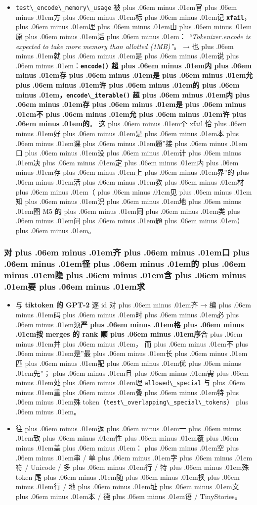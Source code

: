 \documentclass[
]{article}
\newcommand{\passthrough}[1]{#1}
\providecommand{\tightlist}{%
  \setlength{\itemsep}{0pt}\setlength{\parskip}{0pt}}
\def\zh#1{{\zhfont #1}}
\def\sym#1{{\symfont #1}}
\def\zhglue{\hskip0pt plus .06em minus .01em}
\begin{document}
\begin{itemize}
\tightlist
\item
  \passthrough{\lstinline!test\_encode\_memory\_usage!} \zh{被\zhglue 官\zhglue 方\zhglue 标\zhglue 记} \textbf{\passthrough{\lstinline!xfail!}}\zh{，\zhglue 理\zhglue 由\zhglue 原\zhglue 话\zhglue ：} \emph{``Tokenizer.encode is expected to take more memory than allotted (1MB)''}\zh{。} \sym{→} \zh{也\zhglue 就\zhglue 是\zhglue 说\zhglue ：}\textbf{\passthrough{\lstinline!encode()!} \zh{超\zhglue 内\zhglue 存\zhglue 是\zhglue 允\zhglue 许\zhglue 的\zhglue ，}\passthrough{\lstinline!encode\_iterable()!} \zh{超\zhglue 内\zhglue 存\zhglue 是\zhglue 不\zhglue 允\zhglue 许\zhglue 的}}\zh{。} \zh{这\zhglue 个} xfail \zh{恰\zhglue 好\zhglue 是\zhglue 本\zhglue 课\zhglue 题}''\zh{接\zhglue 口\zhglue 设\zhglue 计\zhglue 决\zhglue 定\zhglue 内\zhglue 存\zhglue 上\zhglue 界}''\zh{的\zhglue 活\zhglue 教\zhglue 材\zhglue （\zhglue 见\zhglue 知\zhglue 识\zhglue 地\zhglue 图} M5 \zh{的\zhglue 同\zhglue 类\zhglue 问\zhglue 题\zhglue ）\zhglue 。}
\end{itemize}

\subsubsection{\zh{对\zhglue 齐\zhglue 口\zhglue 径\zhglue 的\zhglue 隐\zhglue 含\zhglue 要\zhglue 求}}\label{ux5bf9ux9f50ux53e3ux5f84ux7684ux9690ux542bux8981ux6c42}

\begin{itemize}
\tightlist
\item
  \zh{与} \textbf{tiktoken \zh{的} GPT-2} \zh{逐} id \zh{对\zhglue 齐} \sym{→} \zh{编\zhglue 码\zhglue 时\zhglue 必\zhglue 须}\textbf{\zh{严\zhglue 格\zhglue 按} merges \zh{的} rank \zh{顺\zhglue 序}}\zh{合\zhglue 并\zhglue ，} \zh{而\zhglue 不\zhglue 是}''\zh{最\zhglue 长\zhglue 匹\zhglue 配\zhglue 优\zhglue 先}''\zh{；\zhglue 且\zhglue 需\zhglue 处\zhglue 理} \passthrough{\lstinline!allowed\_special!} \zh{与\zhglue 重\zhglue 叠\zhglue 特\zhglue 殊} token\zh{（}\passthrough{\lstinline!test\_overlapping\_special\_tokens!}\zh{）\zhglue 。}
\item
  \zh{往\zhglue 返\zhglue 一\zhglue 致\zhglue 性\zhglue 覆\zhglue 盖\zhglue ：\zhglue 空\zhglue 串} / \zh{单\zhglue 字\zhglue 符} / Unicode / \zh{多\zhglue 行} / \zh{特\zhglue 殊} token \zh{尾\zhglue 随\zhglue 换\zhglue 行} / \zh{地\zhglue 址\zhglue 文\zhglue 本} / \zh{德\zhglue 语} / TinyStories\zh{。}
\end{itemize}
\end{document}
